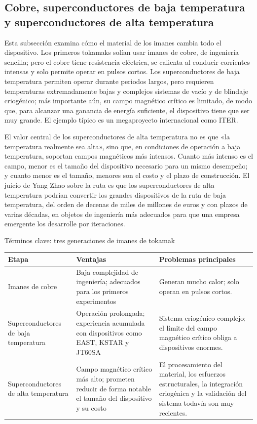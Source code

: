 \subsection{Cobre, superconductores de baja temperatura y superconductores de alta temperatura}

Esta subsección examina cómo el material de los imanes cambia todo el dispositivo. Los primeros tokamaks solían usar imanes de cobre, de ingeniería sencilla; pero el cobre tiene resistencia eléctrica, se calienta al conducir corrientes intensas y solo permite operar en pulsos cortos. Los superconductores de baja temperatura permiten operar durante periodos largos, pero requieren temperaturas extremadamente bajas y complejos sistemas de vacío y de blindaje criogénico; más importante aún, su campo magnético crítico es limitado, de modo que, para alcanzar una ganancia de energía suficiente, el dispositivo tiene que ser muy grande. El ejemplo típico es un megaproyecto internacional como ITER.

El valor central de los superconductores de alta temperatura no es que «la temperatura realmente sea alta», sino que, en condiciones de operación a baja temperatura, soportan campos magnéticos más intensos. Cuanto más intenso es el campo, menor es el tamaño del dispositivo necesario para un mismo desempeño; y cuanto menor es el tamaño, menores son el costo y el plazo de construcción. El juicio de Yang Zhao sobre la ruta es que los superconductores de alta temperatura podrían convertir los grandes dispositivos de la ruta de baja temperatura, del orden de decenas de miles de millones de euros y con plazos de varias décadas, en objetos de ingeniería más adecuados para que una empresa emergente los desarrolle por iteraciones.

\begin{knowledgebox}{Términos clave: tres generaciones de imanes de tokamak}
\begin{tabularx}{\textwidth}{p{}p{}X}
\toprule
Etapa & Ventajas & Problemas principales \\
\midrule
Imanes de cobre & Baja complejidad de ingeniería; adecuados para los primeros experimentos & Generan mucho calor; solo operan en pulsos cortos. \\
Superconductores de baja temperatura & Operación prolongada; experiencia acumulada con dispositivos como EAST, KSTAR y JT60SA & Sistema criogénico complejo; el límite del campo magnético crítico obliga a dispositivos enormes. \\
Superconductores de alta temperatura & Campo magnético crítico más alto; prometen reducir de forma notable el tamaño del dispositivo y su costo & El procesamiento del material, los esfuerzos estructurales, la integración criogénica y la validación del sistema todavía son muy recientes. \\
\bottomrule
\end{tabularx}
\end{knowledgebox}

